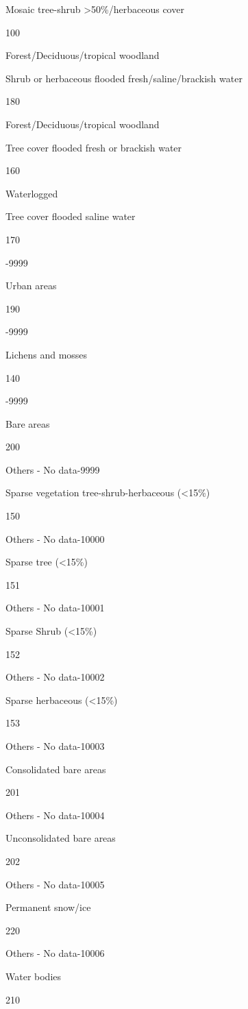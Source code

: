 \documentclass[
  10pt,
  b5paper,
]{book}
\begin{document}
Mosaic tree-shrub \textgreater50\%/herbaceous cover

100

Forest/Deciduous/tropical woodland

Shrub or herbaceous flooded fresh/saline/brackish water

180

Forest/Deciduous/tropical woodland

Tree cover flooded fresh or brackish water

160

Waterlogged

Tree cover flooded saline water

170

-9999

Urban areas

190

-9999

Lichens and mosses

140

-9999

Bare areas

200

Others - No data-9999

Sparse vegetation tree-shrub-herbaceous (\textless15\%)

150

Others - No data-10000

Sparse tree (\textless15\%)

151

Others - No data-10001

Sparse Shrub (\textless15\%)

152

Others - No data-10002

Sparse herbaceous (\textless15\%)

153

Others - No data-10003

Consolidated bare areas

201

Others - No data-10004

Unconsolidated bare areas

202

Others - No data-10005

Permanent snow/ice

220

Others - No data-10006

Water bodies

210
\end{document}
